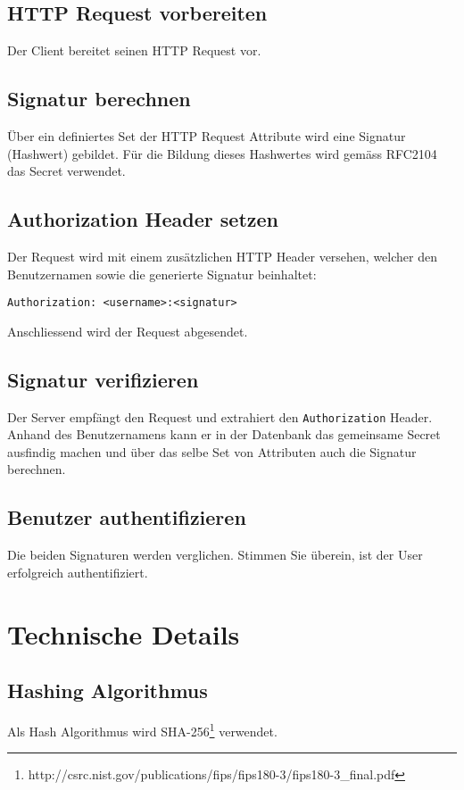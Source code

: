 \documentclass[10pt,a4paper]{scrartcl}
\begin{document}
\subsection{HTTP Request vorbereiten}
Der Client bereitet seinen HTTP Request vor. 

\subsection{Signatur berechnen}
Über ein definiertes Set der HTTP Request Attribute wird eine Signatur (Hashwert) gebildet. Für
die Bildung dieses Hashwertes wird gemäss RFC2104 das Secret verwendet.

\subsection{Authorization Header setzen}
Der Request wird mit einem zusätzlichen HTTP Header versehen, welcher den Benutzernamen sowie die
generierte Signatur beinhaltet:

\begin{verbatim}
Authorization: <username>:<signatur>
\end{verbatim}

Anschliessend wird der Request abgesendet.

\subsection{Signatur verifizieren}
Der Server empfängt den Request und extrahiert den \texttt{Authorization} Header. Anhand des
Benutzernamens kann er in der Datenbank das gemeinsame Secret ausfindig machen und über das selbe
Set von Attributen auch die Signatur berechnen.

\subsection{Benutzer authentifizieren}
Die beiden Signaturen werden verglichen. Stimmen Sie überein, ist der User erfolgreich
authentifiziert.


\section{Technische Details}

\subsection{Hashing Algorithmus}
Als Hash Algorithmus wird
SHA-256\footnote{http://csrc.nist.gov/publications/fips/fips180-3/fips180-3\_final.pdf} verwendet.
\end{document}
